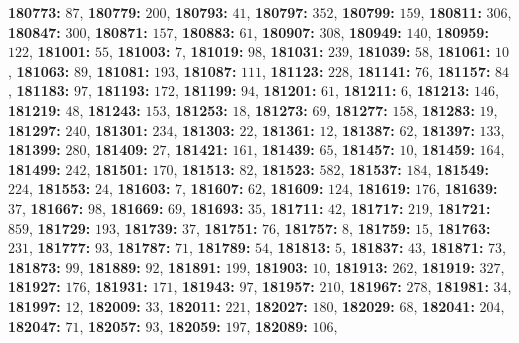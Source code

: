 \textsf{\bfseries 180773:} $87$, \textsf{\bfseries 180779:} $200$, \textsf{\bfseries 180793:} $41$, \textsf{\bfseries 180797:} $352$, \textsf{\bfseries 180799:} $159$, \textsf{\bfseries 180811:} $306$, \textsf{\bfseries 180847:} $300$, \textsf{\bfseries 180871:} $157$, \textsf{\bfseries 180883:} $61$, \textsf{\bfseries 180907:} $308$, \textsf{\bfseries 180949:} $140$, \textsf{\bfseries 180959:} $122$, \textsf{\bfseries 181001:} $55$, \textsf{\bfseries 181003:} $7$, \textsf{\bfseries 181019:} $98$, \textsf{\bfseries 181031:} $239$, \textsf{\bfseries 181039:} $58$, \textsf{\bfseries 181061:} $10$, \textsf{\bfseries 181063:} $89$, \textsf{\bfseries 181081:} $193$, \textsf{\bfseries 181087:} $111$, \textsf{\bfseries 181123:} $228$, \textsf{\bfseries 181141:} $76$, \textsf{\bfseries 181157:} $84$, \textsf{\bfseries 181183:} $97$, \textsf{\bfseries 181193:} $172$, \textsf{\bfseries 181199:} $94$, \textsf{\bfseries 181201:} $61$, \textsf{\bfseries 181211:} $6$, \textsf{\bfseries 181213:} $146$, \textsf{\bfseries 181219:} $48$, \textsf{\bfseries 181243:} $153$, \textsf{\bfseries 181253:} $18$, \textsf{\bfseries 181273:} $69$, \textsf{\bfseries 181277:} $158$, \textsf{\bfseries 181283:} $19$, \textsf{\bfseries 181297:} $240$, \textsf{\bfseries 181301:} $234$, \textsf{\bfseries 181303:} $22$, \textsf{\bfseries 181361:} $12$, \textsf{\bfseries 181387:} $62$, \textsf{\bfseries 181397:} $133$, \textsf{\bfseries 181399:} $280$, \textsf{\bfseries 181409:} $27$, \textsf{\bfseries 181421:} $161$, \textsf{\bfseries 181439:} $65$, \textsf{\bfseries 181457:} $10$, \textsf{\bfseries 181459:} $164$, \textsf{\bfseries 181499:} $242$, \textsf{\bfseries 181501:} $170$, \textsf{\bfseries 181513:} $82$, \textsf{\bfseries 181523:} $582$, \textsf{\bfseries 181537:} $184$, \textsf{\bfseries 181549:} $224$, \textsf{\bfseries 181553:} $24$, \textsf{\bfseries 181603:} $7$, \textsf{\bfseries 181607:} $62$, \textsf{\bfseries 181609:} $124$, \textsf{\bfseries 181619:} $176$, \textsf{\bfseries 181639:} $37$, \textsf{\bfseries 181667:} $98$, \textsf{\bfseries 181669:} $69$, \textsf{\bfseries 181693:} $35$, \textsf{\bfseries 181711:} $42$, \textsf{\bfseries 181717:} $219$, \textsf{\bfseries 181721:} $859$, \textsf{\bfseries 181729:} $193$, \textsf{\bfseries 181739:} $37$, \textsf{\bfseries 181751:} $76$, \textsf{\bfseries 181757:} $8$, \textsf{\bfseries 181759:} $15$, \textsf{\bfseries 181763:} $231$, \textsf{\bfseries 181777:} $93$, \textsf{\bfseries 181787:} $71$, \textsf{\bfseries 181789:} $54$, \textsf{\bfseries 181813:} $5$, \textsf{\bfseries 181837:} $43$, \textsf{\bfseries 181871:} $73$, \textsf{\bfseries 181873:} $99$, \textsf{\bfseries 181889:} $92$, \textsf{\bfseries 181891:} $199$, \textsf{\bfseries 181903:} $10$, \textsf{\bfseries 181913:} $262$, \textsf{\bfseries 181919:} $327$, \textsf{\bfseries 181927:} $176$, \textsf{\bfseries 181931:} $171$, \textsf{\bfseries 181943:} $97$, \textsf{\bfseries 181957:} $210$, \textsf{\bfseries 181967:} $278$, \textsf{\bfseries 181981:} $34$, \textsf{\bfseries 181997:} $12$, \textsf{\bfseries 182009:} $33$, \textsf{\bfseries 182011:} $221$, \textsf{\bfseries 182027:} $180$, \textsf{\bfseries 182029:} $68$, \textsf{\bfseries 182041:} $204$, \textsf{\bfseries 182047:} $71$, \textsf{\bfseries 182057:} $93$, \textsf{\bfseries 182059:} $197$, \textsf{\bfseries 182089:} $106$, 
